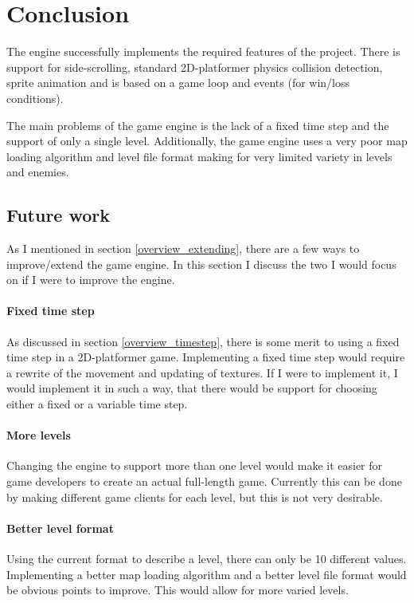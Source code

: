 \section{Conclusion}
The engine successfully implements the required features of the project. There is support for side-scrolling, standard 2D-platformer physics collision detection, sprite animation and is based on a game loop and events (for win/loss conditions).

The main problems of the game engine is the lack of a fixed time step and the support of only a single level. Additionally, the game engine uses a very poor map loading algorithm and level file format making for very limited variety in levels and enemies.

\subsection{Future work}
As I mentioned in section \ref{overview_extending}, there are a few ways to improve/extend the game engine. In this section I discuss the two I would focus on if I were to improve the engine.
\paragraph{Fixed time step}
As discussed in section \ref{overview_timestep}, there is some merit to using a fixed time step in a 2D-platformer game. Implementing a fixed time step would require a rewrite of the movement and updating of textures. If I were to implement it, I would implement it in such a way, that there would be support for choosing either a fixed or a variable time step.
\paragraph{More levels}
Changing the engine to support more than one level would make it easier for game developers to create an actual full-length game. Currently this can be done by making different game clients for each level, but this is not very desirable.
\paragraph{Better level format}
Using the current format to describe a level, there can only be 10 different values. Implementing a better map loading algorithm and a better level file format would be obvious points to improve. This would allow for more varied levels.